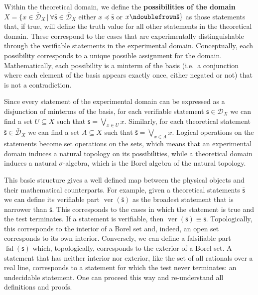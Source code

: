 \documentclass{article}
\def\bigOR{\bigvee}
\newcommand{\stmt}[1][s] {\mathsf{#1}} %
\newcommand{\tstmt}[1][s] {\bar{\mathsf{#1}}} %
\def\ncomp{\ndoublefrown}
\def\narrower{\preccurlyeq} %
\newcommand{\edomain}[1][D] {\mathcal{#1}} %
\newcommand{\tdomain}[1][D] {\bar{\mathcal{#1}}} %
\DeclareMathOperator{\ver}{ver}
\DeclareMathOperator{\fal}{fal}
\begin{document}
Within the theoretical domain, we define the  \textbf{possibilities of the domain} $X = \{ x \in \tdomain_X \, | \, \forall \tstmt \in \tdomain_X $ either $x \narrower \tstmt$ or $x \ncomp \tstmt\}$ as those statements that, if true, will define the truth value for all other statements in the theoretical domain. These correspond to the cases that are experimentally distinguishable through the verifiable statements in the experimental domain. Conceptually, each possibility corresponds to a unique possible assignment for the domain. Mathematically, each possibility is a minterm of the basis (i.e.~a conjunction where each element of the basis appears exactly once, either negated or not) that is not a contradiction.

Since every statement of the experimental domain can be expressed as a disjunction of minterms of the basis, for each verifiable statement $\stmt \in \edomain_X$ we can find a set $U \subseteq X$ such that $\stmt = \bigOR_{x \in U} x$. Similarly, for each theoretical statement $\tstmt \in \tdomain_X$ we can find a set $A \subseteq X$ such that $\tstmt = \bigOR_{x \in A} x$. Logical operations on the statements become set operations on the sets, which means that an experimental domain induces a natural topology on its possibilities, while a theoretical domain induces a natural $\sigma$-algebra, which is the Borel algebra of the natural topology.

This basic structure gives a well defined map between the physical objects and their mathematical counterparts. For example, given a theoretical statements $\tstmt$ we can define its verifiable part $\ver(\tstmt)$ as the broadest statement that is narrower than $\tstmt$. This corresponds to the cases in which the statement is true and the test terminates. If a statement is verifiable, then $\ver(\tstmt) \equiv \tstmt$. Topologically, this corresponds to the interior of a Borel set and, indeed, an open set corresponds to its own interior. Conversely, we can define a falsifiable part $\fal(\tstmt)$ which, topologically, corresponds to the exterior of a Borel set. A statement that has neither interior nor exterior, like the set of all rationals over a real line, corresponds to a statement for which the test never terminates: an undecidable statement. One can proceed this way and re-understand all definitions and proofs.
\end{document}
